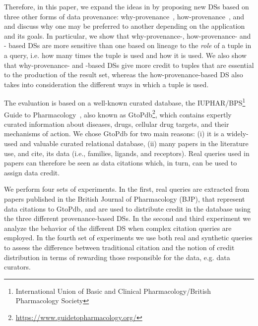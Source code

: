 Therefore, in this paper, we expand the ideas in \citep{dosso2020data} by proposing new DSs based on three other forms of data provenance: why-provenance~\citep{WhyProvBuneman}, how-provenance~\citep{howProvenanceGreen}, and  
 and discuss why one may be preferred to another depending on the application and its goals. 
In particular, we show that why-provenance-,  how-provenance- and - based DSs are more sensitive than one based on lineage to the {\em role} of a tuple in a query, i.e. how many times the tuple is used and how it is used. We also show that
why-provenance- and -based DSs give more credit to tuples that are essential to the production of the result set, whereas the how-provenance-based DS also takes into consideration the different ways in which a tuple is used. 

The evaluation is based on a well-known curated database, the IUPHAR/BPS\footnote{International Union of Basic and Clinical Pharmacology/British Pharmacology Society} Guide to Pharmacology~\citep{iuphar2018}, also known as GtoPdb\footnote{\url{https://www.guidetopharmacology.org/}}, which contains expertly curated information about diseases, drugs, cellular drug targets, and their mechanisms of action.
We chose GtoPdb for two main reasons: (i) it is a widely-used and valuable curated relational database, (ii) many papers in the literature use, and cite, its data (i.e., families, ligands, and receptors). 
Real queries used in papers can therefore be seen as data citations which, in turn, can be used to assign data credit.

We perform four sets of experiments. In the first, real queries are extracted from papers published in the British Journal of Pharmacology (BJP), that represent data citations to GtoPdb, and are used to distribute credit in the database using the three different provenance-based DSs. 
In the second and third experiment we analyze the behavior of the different DS when complex citation queries are employed.
In the fourth set of experiments we use both real and synthetic queries to assess the difference between traditional citation and the notion of credit distribution in terms of rewarding those responsible for the data, e.g. data curators.

